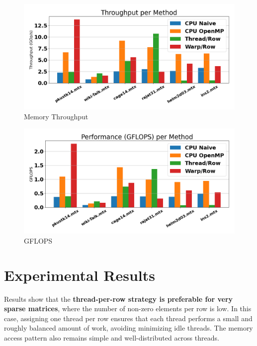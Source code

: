 \documentclass[conference]{IEEEtran}
\begin{document}
\begin{figure}
    \centering
    \includegraphics[width=1.0\linewidth]{throughput.png}
    \caption{Memory Throughput}
    \label{fig:throughputimg}
\end{figure}

\begin{figure}
    \centering
    \includegraphics[width=1.0\linewidth]{GFLOPS.png}
    \caption{GFLOPS}
    \label{fig:gflopsimg}
\end{figure}

\newpage

\section{Experimental Results}
Results show that the \textbf{thread-per-row strategy is preferable for very sparse matrices}, where the number of non-zero elements per row is low. In this case, assigning one thread per row ensures that each thread performs a small and roughly balanced amount of work, avoiding minimizing idle threads. The memory access pattern also remains simple and well-distributed across threads.
\end{document}
